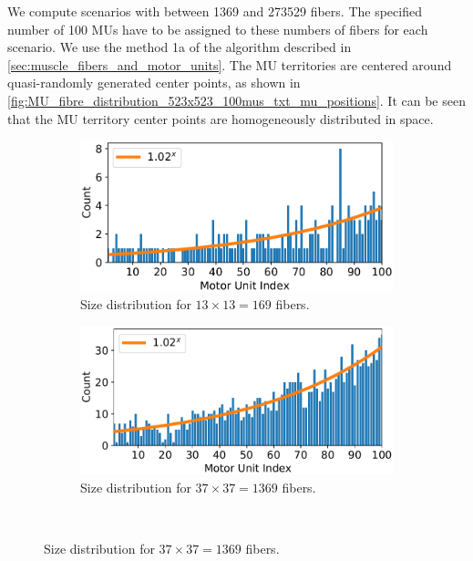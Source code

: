 We compute scenarios with between \num{1369} and \num{273529} fibers. The specified number of 100 MUs have to be assigned to these numbers of fibers for each scenario.
We use the method 1a of the algorithm described in \cref{sec:muscle_fibers_and_motor_units}. The MU territories are centered around quasi-randomly generated center points, as shown in \cref{fig:MU_fibre_distribution_523x523_100mus_txt_mu_positions}. It can be seen that the MU territory center points are homogeneously distributed in space.


\begin{figure}
  \centering%
  \begin{subfigure}[t]{0.45\textwidth}%
    \centering%
    \includegraphics[width=\textwidth]{images/results/application/MU_fibre_distribution_13x13_100mus_txt_fiber_distribution.pdf}%
    \caption{Size distribution for $13\times 13 = 169$ fibers.}%
    \label{fig:mus_13}%
  \end{subfigure} \quad
  \begin{subfigure}[t]{0.45\textwidth}%
    \centering%
    \includegraphics[width=\textwidth]{images/results/application/MU_fibre_distribution_37x37_100mus_txt_fiber_distribution.pdf}%
    \caption{Size distribution for $37\times 37 = 1369$ fibers.}%
    \label{fig:mus_37}%
  \end{subfigure}  \\

\end{figure}
